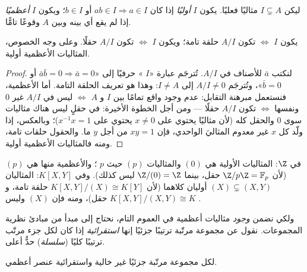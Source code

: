 \begin{definition}\label{def:b3:rings:primemaximal}
ليكن $I \subsetneq A$ مثاليًا فعليًا. يكون $I$ \emph{أوليًا}
 إذا كان $ab \in I \Rightarrow a \in I$ أو $b \in I$؛ ويكون $I$
\emph{أعظميًا} إذا لم يقع أي  بينه وبين
$A$ وقوعًا تامًّا.
\end{definition}

\begin{proposition}\label{prop:b3:rings:primemaximal}
يكون $I$  $\iff$ تكون $A/I$ حلقة تامة؛ ويكون $I$ 
$\iff$ تكون $A/I$ حقلًا. وعلى وجه الخصوص، المثاليات الأعظمية
أولية.
\end{proposition}

\begin{proof}
لنكتب $\bar a$ للأصناف في $A/I$. تُترجَم عبارة «$I$ » حرفيًا
إلى «$\bar a\bar b = 0 \Rightarrow \bar a = 0$ أو $\bar b
= 0$»، وتُترجَم $A/I \neq 0$ إلى $I \neq A$:
وهذا هو تعريف الحلقة التامة. أما الأعظمية، فنستعمل مبرهنة
التقابل: عدم وجود  واقع تمامًا بين $I$ و $A$ $\iff$ ليس
في $A/I$  غير $0$ ونفسها $\iff$ تكون $A/I$ حقلًا --- ومن أجل
الخطوة الأخيرة: في حقلٍ ليس هناك مثاليات سوى $0$ والحقل كله (لأن
مثاليًا يحتوي على $x \ne 0$ يحتوي على $x^{-1}x = 1$)؛ وبالعكس،
إذا ولّد كل $x$ غير معدوم المثاليَ الواحدي، فإن $xy = 1$ من أجل
$y$ ما. والحقول حلقات تامة، ومنه فالمثاليات الأعظمية أولية.
\end{proof}

\begin{example}\label{ex:b3:rings:primemaximal}
في $\Z$: المثاليات الأولية هي $(0)$ والمثاليات $(p)$ حيث $p$
؛ والأعظمية منها هي $(p)$ (لأن $\Z/p\Z = \mathbb F_p$ حقل، بينما
$\Z/(0) = \Z$ ليس كذلك). وفي $K[X, Y]$: المثاليان $(X) \subsetneq (X, Y)$ أوليان
كلاهما (لأن $K[X,Y]/(X) \cong K[Y]$ حلقة تامة، و $K[X,Y]/(X,Y) \cong K$ حقل)، ومنه فإن $(X)$
 وليس .
\end{example}

ولكي نضمن \emph{وجود} مثاليات أعظمية في العموم التام، نحتاج إلى
مبدأ من مبادئ نظرية المجموعات. نقول عن مجموعة مرتّبة ترتيبًا
جزئيًا إنها \emph{استقرائية} إذا كان لكل جزء مرتّب ترتيبًا كليًا
(\emph{سلسلة}) حدٌّ أعلى.

\begin{theorem}\label{thm:b3:rings:zorn}
لكل مجموعة مرتّبة جزئيًا غير خالية واستقرائية عنصر
أعظمي.
\admitted
\end{theorem}

